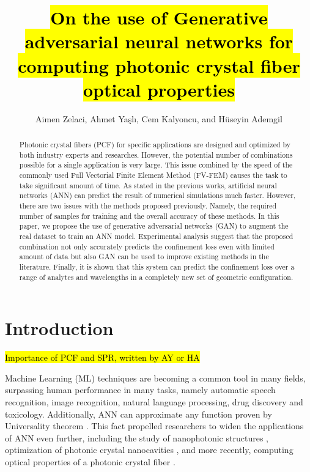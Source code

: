 \documentclass[draft, 10pt]{IEEEtran}
\begin{document}
\title{\hl{On the use of Generative adversarial neural networks for computing photonic crystal fiber optical properties}}

\author{Aimen Zelaci, Ahmet Yaşlı, Cem Kalyoncu, and Hüseyin Ademgil}

\maketitle
	
\begin{abstract}
Photonic crystal fibers (PCF) for specific applications are designed and optimized by both industry experts and researches. However, the potential number of combinations possible for a single application is very large. This issue combined by the speed of the commonly used Full Vectorial Finite Element Method (FV-FEM) causes the task to take significant amount of time. As stated in the previous works, artificial neural networks (ANN) can predict the result of numerical simulations much faster. However, there are two issues with the methods proposed previously. Namely, the required number of samples for training and the overall accuracy of these methods. In this paper, we  propose the use of generative adversarial networks (GAN) to augment the real dataset to train an ANN model. Experimental analysis suggest that the proposed combination not only accurately predicts the confinement loss even with limited amount of data but also GAN can be used to improve existing methods in the literature. Finally, it is shown that this system can predict the confinement loss over a range of analytes and wavelengths in a completely new set of geometric configuration.
\end{abstract}

\section{Introduction}

\hl{Importance of PCF and SPR, written by AY or HA}
	
Machine Learning (ML) techniques are becoming a common tool in many fields, surpassing human performance in many tasks, namely automatic speech recognition, image recognition, natural language processing, drug discovery and toxicology. Additionally, ANN can approximate any function proven by Universality theorem \cite{HORNIK1991251}. This fact propelled researchers to widen the applications of ANN even further, including the study of nanophotonic structures \cite{kiarashinejad2020knowledge}, optimization of photonic crystal nanocavities \cite{asano2018optimization}, and more recently, computing optical properties of a photonic crystal fiber \cite{paper0}.
\end{document}
